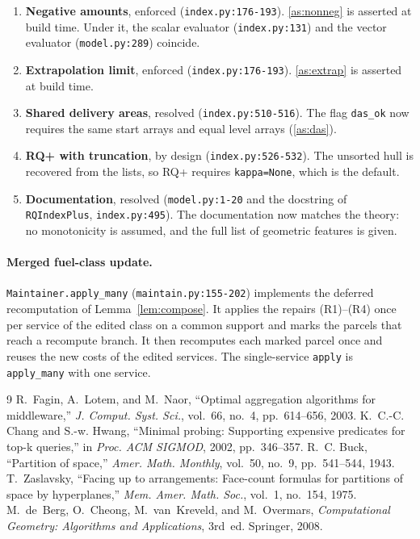 \documentclass[11pt]{article}
\theoremstyle{definition}
\theoremstyle{remark}
\newcommand{\code}[1]{\texttt{#1}}
\begin{document}
\begin{enumerate}[label=M\arabic*,leftmargin=*]
\item \textbf{Negative amounts}, enforced (\code{index.py:176-193}). \ref{as:nonneg} is
asserted at build time. Under it, the scalar evaluator (\code{index.py:131}) and the
vector evaluator (\code{model.py:289}) coincide.
\item \textbf{Extrapolation limit}, enforced (\code{index.py:176-193}). \ref{as:extrap} is
asserted at build time.
\item \textbf{Shared delivery areas}, resolved (\code{index.py:510-516}). The flag
\code{das\_ok} now requires the same start arrays and equal level arrays
(\ref{as:das}).
\item \textbf{RQ+ with truncation}, by design (\code{index.py:526-532}). The unsorted hull
is recovered from the lists, so RQ+ requires \code{kappa=None}, which is the default.
\item \textbf{Documentation}, resolved (\code{model.py:1-20} and the docstring of
\code{RQIndexPlus}, \code{index.py:495}). The documentation now matches the theory: no
monotonicity is assumed, and the full list of geometric features is given.
\end{enumerate}
\endgroup

\paragraph{Merged fuel-class update.} \code{Maintainer.apply\_many}
(\code{maintain.py:155-202}) implements the deferred recomputation of
Lemma~\ref{lem:compose}. It applies the repairs (R1)--(R4) once per service of the edited
class on a common support and marks the parcels that reach a recompute branch. It then
recomputes each marked parcel once and reuses the new costs of the edited services. The
single-service \code{apply} is \code{apply\_many} with one service.

\begin{thebibliography}{9}
R.~Fagin, A.~Lotem, and M.~Naor, ``Optimal aggregation algorithms for middleware,''
\emph{J. Comput. Syst. Sci.}, vol.~66, no.~4, pp.~614--656, 2003.
K.~C.-C. Chang and S.-w. Hwang, ``Minimal probing: Supporting expensive predicates for
top-k queries,'' in \emph{Proc. ACM SIGMOD}, 2002, pp.~346--357.
R.~C. Buck, ``Partition of space,'' \emph{Amer. Math. Monthly}, vol.~50, no.~9,
pp.~541--544, 1943.
T.~Zaslavsky, ``Facing up to arrangements: Face-count formulas for partitions of space
by hyperplanes,'' \emph{Mem. Amer. Math. Soc.}, vol.~1, no.~154, 1975.
M.~de~Berg, O.~Cheong, M.~van~Kreveld, and M.~Overmars, \emph{Computational Geometry:
Algorithms and Applications}, 3rd~ed. Springer, 2008.
\end{thebibliography}
\end{document}
